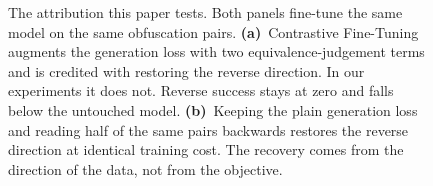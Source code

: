 \begin{figure}[t]
\begin{tikzpicture}
\end{tikzpicture}
\caption{The attribution this paper tests. Both panels fine-tune the same model on the same
obfuscation pairs. \textbf{(a)}~Contrastive Fine-Tuning augments the generation loss with two
equivalence-judgement terms and is credited with restoring the reverse direction. In our
experiments it does not. Reverse success stays at zero and falls below the untouched model.
\textbf{(b)}~Keeping the plain generation loss and reading half of the same pairs backwards
restores the reverse direction at identical training cost. The recovery comes from the
direction of the data, not from the objective.}
\label{fig:attribution}
\end{figure}
